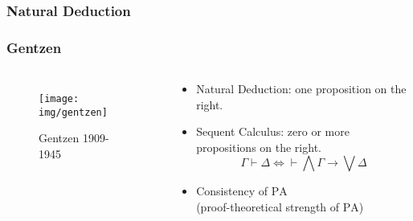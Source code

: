 \documentclass[UTF8,aspectratio=43,11pt,colorlinks,compress,openany]{beamer}%
\begin{document}
\subsubsection{Natural Deduction}

\begin{frame}\frametitle{Gentzen}
	\begin{columns}
		\vspace{-2ex}
			\begin{figure}
				\texttt{[image: img/gentzen]}\caption{Gentzen 1909-1945}
			\end{figure}
			\begin{block}{}
				\begin{itemize}
					\item Natural Deduction: one proposition on the right.
					\item Sequent Calculus: zero or more propositions on the right.
					\[\Gamma\vdash\Delta\iff\vdash\bigwedge\Gamma\to\bigvee\Delta\]
					\item Consistency of $\mathrm{PA}$\\
					(proof-theoretical strength of $\mathrm{PA}$)
				\end{itemize}
			\end{block}
	\end{columns}
\end{frame}
\end{document}

